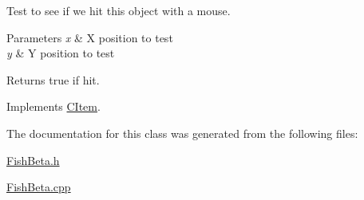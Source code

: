 Test to see if we hit this object with a mouse. 
\begin{DoxyParams}{Parameters}
{\em x} & X position to test \\
\hline
{\em y} & Y position to test \\
\hline
\end{DoxyParams}
\begin{DoxyReturn}{Returns}
true if hit. 
\end{DoxyReturn}


Implements \hyperlink{class_c_item_a8bd4f5e3f2eb2487125dd435719484e8}{C\+Item}.



The documentation for this class was generated from the following files\+:\begin{DoxyCompactItemize}
\item 
\hyperlink{_fish_beta_8h}{Fish\+Beta.\+h}\item 
\hyperlink{_fish_beta_8cpp}{Fish\+Beta.\+cpp}\end{DoxyCompactItemize}
